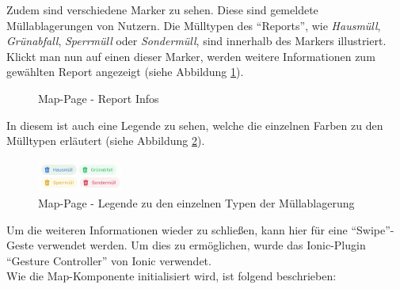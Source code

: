 \documentclass[a4paper, 11pt, DIV=11, listof=numbered, numbers=noenddot]{scrartcl}
\begin{document}
	Zudem sind verschiedene Marker zu sehen. Diese sind gemeldete Müllablagerungen von Nutzern. Die Mülltypen des \enquote{Reports}, wie \textit{Hausmüll}, \textit{Grünabfall}, \textit{Sperrmüll} oder \textit{Sondermüll}, sind innerhalb des Markers illustriert. 
	Klickt man nun auf einen dieser Marker, werden weitere Informationen zum gewählten Report angezeigt (siehe Abbildung \ref{fig:app-map-report}).
	\begin{figure}[!htbp]
		\centering
		\hfill%
		\hfill%
		\caption{Map-Page - Report Infos}\label{fig:app-map-report}
	\end{figure}
	In diesem ist auch eine Legende zu sehen, welche die einzelnen Farben zu den Mülltypen erläutert (siehe Abbildung \ref{fig:legend}).
	\begin{figure}[!htbp]
		\centering
		\includegraphics[width=0.25\textwidth]{img/app/legend.png}
		\caption{Map-Page - Legende zu den einzelnen Typen der Müllablagerung}\label{fig:legend}
	\end{figure}
	Um die weiteren Informationen wieder zu schließen, kann hier für eine \enquote{Swipe}-Geste verwendet werden. Um dies zu ermöglichen, wurde das Ionic-Plugin \enquote{Gesture Controller} von Ionic verwendet.\\
	Wie die Map-Komponente initialisiert wird, ist folgend beschrieben:
\end{document}
